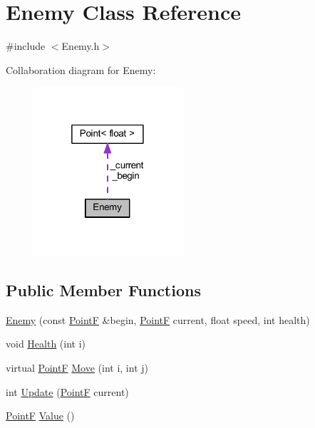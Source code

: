 \hypertarget{class_enemy}{}\section{Enemy Class Reference}
\label{class_enemy}


{\ttfamily \#include $<$Enemy.\+h$>$}



Collaboration diagram for Enemy\+:\nopagebreak
\begin{figure}[H]
\begin{center}
\leavevmode
\includegraphics[width=157pt]{class_enemy__coll__graph}
\end{center}
\end{figure}
\subsection*{Public Member Functions}
\begin{DoxyCompactItemize}
\item 
\hyperlink{class_enemy_a071d0a60046e25ffe08ea7be368d6693}{Enemy} (const \hyperlink{drawtools_8h_adc4a66bcb59b74164130ed47cb387ec3}{PointF} \&begin, \hyperlink{drawtools_8h_adc4a66bcb59b74164130ed47cb387ec3}{PointF} current, float speed, int health)
\item 
void \hyperlink{class_enemy_a7eb5149d39871cd4b004af55544e7764}{Health} (int i)
\item 
virtual \hyperlink{drawtools_8h_adc4a66bcb59b74164130ed47cb387ec3}{PointF} \hyperlink{class_enemy_a0ce854e74bf13c8e0d272490e29e4542}{Move} (int i, int j)
\item 
int \hyperlink{class_enemy_a1468172359f52b6f3616d3dddf5d2b0b}{Update} (\hyperlink{drawtools_8h_adc4a66bcb59b74164130ed47cb387ec3}{PointF} current)
\item 
\hyperlink{drawtools_8h_adc4a66bcb59b74164130ed47cb387ec3}{PointF} \hyperlink{class_enemy_a2fb6127ab87c9cb03eda0c1da8cefd81}{Value} ()
\end{DoxyCompactItemize}
